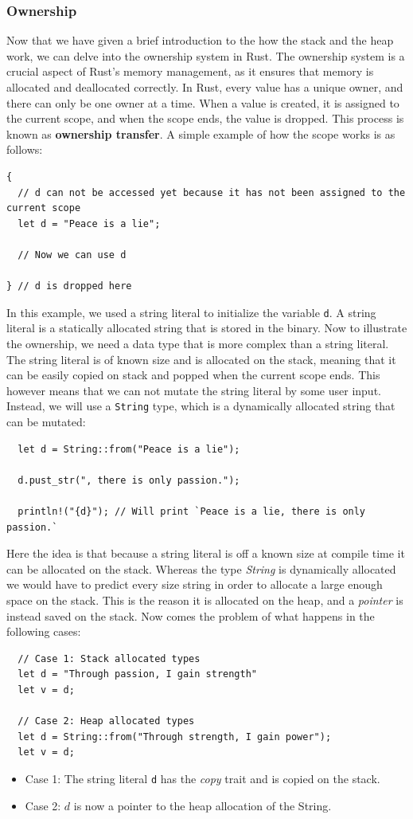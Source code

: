 \documentclass[twoside,11pt]{report}
\theoremstyle{definition}
\theoremstyle{plain}
\begin{document}
\subsubsection{Ownership}
Now that we have given a brief introduction to the how the stack and the heap work, we can delve into the ownership system in Rust. The ownership system is a crucial aspect of Rust's memory management, as it ensures that memory is allocated and deallocated correctly. In Rust, every value has a unique owner, and there can only be one owner at a time. When a value is created, it is assigned to the current scope, and when the scope ends, the value is dropped. This process is known as \textbf{ownership transfer}.
A simple example of how the scope works is as follows:
\begin{verbatim}
{
  // d can not be accessed yet because it has not been assigned to the current scope
  let d = "Peace is a lie";

  // Now we can use d
 
} // d is dropped here
\end{verbatim}
In this example, we used a string literal to initialize the variable \texttt{d}. A string literal is a statically allocated string that is stored in the binary.
Now to illustrate the ownership, we need a data type that is more complex than a string literal. The string literal is of known size and is allocated on the stack, meaning that it can be easily copied on stack and popped when the current scope ends. This however means that we can not mutate the string literal by some user input. Instead, we will use a \texttt{String} type, which is a dynamically allocated string that can be mutated:
\begin{verbatim}
  let d = String::from("Peace is a lie");

  d.pust_str(", there is only passion.");
  
  println!("{d}"); // Will print `Peace is a lie, there is only passion.`
\end{verbatim}
Here the idea is that because a string literal is off a known size at compile time it can be allocated on the stack. Whereas the type \textit{String} is dynamically allocated we would have to predict every size string in order to allocate a large enough space on the stack. This is the reason it is allocated on the heap, and a \textit{pointer} is instead saved on the stack.
Now comes the problem of what happens in the following cases:
\begin{verbatim}
  // Case 1: Stack allocated types
  let d = "Through passion, I gain strength"
  let v = d;

  // Case 2: Heap allocated types
  let d = String::from("Through strength, I gain power");
  let v = d;
\end{verbatim}
\begin{itemize}
  \item Case 1: The string literal \texttt{d} has the \textit{copy} trait and is copied on the stack.
  \item Case 2: $d$ is now a pointer to the heap allocation of the String.
\end{itemize}
\end{document}
